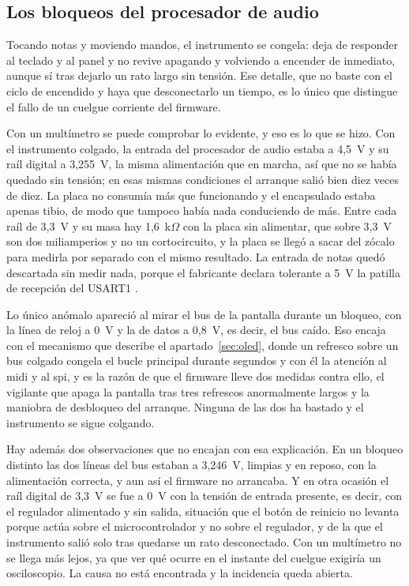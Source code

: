 \subsection*{Los bloqueos del procesador de audio}

Tocando notas y moviendo mandos, el instrumento se congela: deja de responder
al teclado y al panel y no revive apagando y volviendo a encender de inmediato,
aunque sí tras dejarlo un rato largo sin tensión. Ese detalle, que no baste con
el ciclo de encendido y haya que desconectarlo un tiempo, es lo único que
distingue el fallo de un cuelgue corriente del firmware.

Con un multímetro se puede comprobar lo evidente, y eso es lo que se hizo. Con
el instrumento colgado, la entrada del procesador de audio estaba a 4,5~V y su
raíl digital a 3,255~V, la misma alimentación que en marcha, así que no se
había quedado sin tensión; en esas mismas condiciones el arranque salió bien
diez veces de diez. La placa no consumía más que funcionando y el encapsulado
estaba apenas tibio, de modo que tampoco había nada conduciendo de más. Entre
cada raíl de 3,3~V y su masa hay 1,6~k$\Omega$ con la placa sin alimentar, que
sobre 3,3~V son dos miliamperios y no un cortocircuito, y la placa se llegó a
sacar del zócalo para medirla por separado con el mismo resultado. La entrada
de notas quedó descartada sin medir nada, porque el fabricante declara
tolerante a 5~V la patilla de recepción del USART1 \cite{DaisySeed}.

Lo único anómalo apareció al mirar el bus de la pantalla durante un bloqueo,
con la línea de reloj a 0~V y la de datos a 0,8~V, es decir, el bus caído. Eso
encaja con el mecanismo que describe el apartado~\ref{sec:oled}, donde un
refresco sobre un bus colgado congela el bucle principal durante segundos y con
él la atención al \gls{midi} y al \gls{spi}, y es la razón de que el firmware
lleve dos medidas contra ello, el vigilante que apaga la pantalla tras tres
refrescos anormalmente largos y la maniobra de desbloqueo del arranque. Ninguna
de las dos ha bastado y el instrumento se sigue colgando.

Hay además dos observaciones que no encajan con esa explicación. En un bloqueo
distinto las dos líneas del bus estaban a 3,246~V, limpias y en reposo, con la
alimentación correcta, y aun así el firmware no arrancaba. Y en otra ocasión el
raíl digital de 3,3~V se fue a 0~V con la tensión de entrada presente, es decir,
con el regulador alimentado y sin salida, situación que el botón de reinicio no
levanta porque actúa sobre el microcontrolador y no sobre el regulador, y de la
que el instrumento salió solo tras quedarse un rato desconectado. Con un
multímetro no se llega más lejos, ya que ver qué ocurre en el instante del
cuelgue exigiría un osciloscopio. La causa no está encontrada y la incidencia
queda abierta.

